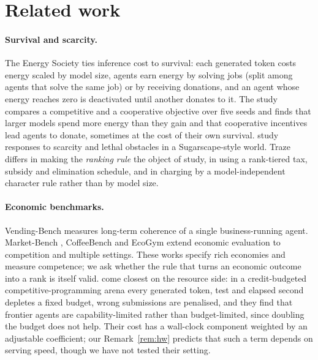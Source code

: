 \documentclass[11pt]{article}
\theoremstyle{plain}
\theoremstyle{remark}
\begin{document}
\section{Related work}
\label{sec:related}

\paragraph{Survival and scarcity.}
The Energy Society \citep{hansen2026energy} ties inference cost to survival: each generated token costs energy scaled by model size, agents earn energy by solving jobs (split among agents that solve the same job) or by receiving donations, and an agent whose energy reaches zero is deactivated until another donates to it. The study compares a competitive and a cooperative objective over five seeds and finds that larger models spend more energy than they gain and that cooperative incentives lead agents to donate, sometimes at the cost of their own survival. \citet{masumori2025survival} study responses to scarcity and lethal obstacles in a Sugarscape-style world. Traze differs in making the \emph{ranking rule} the object of study, in using a rank-tiered tax, subsidy and elimination schedule, and in charging by a model-independent character rule rather than by model size.

\paragraph{Economic benchmarks.}
Vending-Bench \citep{backlund2025vendingbench} measures long-term coherence of a single business-running agent. Market-Bench \citep{zheng2026marketbench}, CoffeeBench \citep{sugiura2026coffeebench} and EcoGym \citep{hu2026ecogym} extend economic evaluation to competition and multiple settings. These works specify rich economies and measure competence; we ask whether the rule that turns an economic outcome into a rank is itself valid.
\citet{zhou2026credit} come closest on the resource side: in a credit-budgeted competitive-programming arena every generated token, test and elapsed second depletes a fixed budget, wrong submissions are penalised, and they find that frontier agents are capability-limited rather than budget-limited, since doubling the budget does not help. Their cost has a wall-clock component weighted by an adjustable coefficient; our Remark~\ref{rem:hw} predicts that such a term depends on serving speed, though we have not tested their setting.
\end{document}
